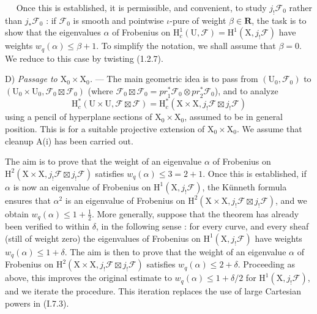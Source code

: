 \documentclass[11pt,leqno]{article}
\newcommand{\Page}[1]{\ifvmode\noindent\else\unskip\ \fi{\footnotesize\textcolor{gray}{[p.\,#1]}}\ \ignorespaces}
\begin{document}
\Page{140}
Once this is established, it is permissible, and convenient, to study \(j_!\mathscr{F}_0\) rather than \(j_*\mathscr{F}_0\) : if \(\mathscr{F}_0\) is smooth and pointwise \(\iota\)-pure of weight \(\beta\in\mathbf{R}\), the task is to show that the eigenvalues \(\alpha\) of Frobenius on \(\mathrm{H}_c^1(\mathrm{U},\mathscr{F})=\mathrm{H}^1(\mathrm{X},j_!\mathscr{F})\) have weights \(w_q(\alpha)\leq\beta+1\). To simplify the notation, we shall assume that \(\beta=0\). We reduce to this case by twisting (1.2.7).

D) \textit{Passage to \(\mathrm{X}_0\times\mathrm{X}_0\).} — The main geometric idea is to pass from \((\mathrm{U}_0,\mathscr{F}_0)\) to \((\mathrm{U}_0\times\mathrm{U}_0,\mathscr{F}_0\boxtimes\mathscr{F}_0)\) (where \(\mathscr{F}_0\boxtimes\mathscr{F}_0=\mathit{pr}_1^*\mathscr{F}_0\otimes\mathit{pr}_2^*\mathscr{F}_0\)), and to analyze
\[
\mathrm{H}_c^*(\mathrm{U}\times\mathrm{U},\mathscr{F}\boxtimes\mathscr{F})
=
\mathrm{H}_c^*(\mathrm{X}\times\mathrm{X},j_!\mathscr{F}\boxtimes j_!\mathscr{F})
\]
using a pencil of hyperplane sections of \(\mathrm{X}_0\times\mathrm{X}_0\), assumed to be in general position. This is for a suitable projective extension of \(\mathrm{X}_0\times\mathrm{X}_0\). We assume that cleanup A(i) has been carried out.

The aim is to prove that the weight of an eigenvalue \(\alpha\) of Frobenius on \(\mathrm{H}^2(\mathrm{X}\times\mathrm{X},j_!\mathscr{F}\boxtimes j_!\mathscr{F})\) satisfies \(w_q(\alpha)\leq 3=2+1\). Once this is established, if \(\alpha\) is now an eigenvalue of Frobenius on \(\mathrm{H}^1(\mathrm{X},j_!\mathscr{F})\), the Künneth formula ensures that \(\alpha^2\) is an eigenvalue of Frobenius on \(\mathrm{H}^2(\mathrm{X}\times\mathrm{X},j_!\mathscr{F}\boxtimes j_!\mathscr{F})\), and we obtain \(w_q(\alpha)\leq 1+\frac{1}{2}\). More generally, suppose that the theorem has already been verified to within \(\delta\), in the following sense : for every curve, and every sheaf (still of weight zero) the eigenvalues of Frobenius on \(\mathrm{H}^1(\mathrm{X},j_!\mathscr{F})\) have weights \(w_q(\alpha)\leq 1+\delta\). The aim is then to prove that the weight of an eigenvalue \(\alpha\) of Frobenius on \(\mathrm{H}^2(\mathrm{X}\times\mathrm{X},j_!\mathscr{F}\boxtimes j_!\mathscr{F})\) satisfies \(w_q(\alpha)\leq 2+\delta\). Proceeding as above, this improves the original estimate to \(w_q(\alpha)\leq 1+\delta/2\) for \(\mathrm{H}^1(\mathrm{X},j_!\mathscr{F})\), and we iterate the procedure. This iteration replaces the use of large Cartesian powers in (I.7.3).
\end{document}
